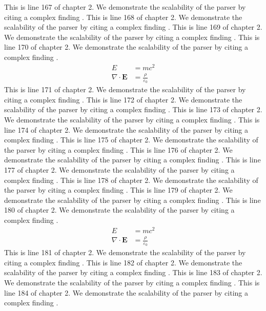 This is line 167 of chapter 2. We demonstrate the scalability of the parser by citing a complex finding \cite{ref2_167}.
This is line 168 of chapter 2. We demonstrate the scalability of the parser by citing a complex finding \cite{ref2_168}.
This is line 169 of chapter 2. We demonstrate the scalability of the parser by citing a complex finding \cite{ref2_169}.
This is line 170 of chapter 2. We demonstrate the scalability of the parser by citing a complex finding \cite{ref2_170}.
\begin{align*}
  E &= mc^2 \\
  \nabla \cdot \mathbf{E} &= \frac{\rho}{\varepsilon_0}
\end{align*}
This is line 171 of chapter 2. We demonstrate the scalability of the parser by citing a complex finding \cite{ref2_171}.
This is line 172 of chapter 2. We demonstrate the scalability of the parser by citing a complex finding \cite{ref2_172}.
This is line 173 of chapter 2. We demonstrate the scalability of the parser by citing a complex finding \cite{ref2_173}.
This is line 174 of chapter 2. We demonstrate the scalability of the parser by citing a complex finding \cite{ref2_174}.
This is line 175 of chapter 2. We demonstrate the scalability of the parser by citing a complex finding \cite{ref2_175}.
This is line 176 of chapter 2. We demonstrate the scalability of the parser by citing a complex finding \cite{ref2_176}.
This is line 177 of chapter 2. We demonstrate the scalability of the parser by citing a complex finding \cite{ref2_177}.
This is line 178 of chapter 2. We demonstrate the scalability of the parser by citing a complex finding \cite{ref2_178}.
This is line 179 of chapter 2. We demonstrate the scalability of the parser by citing a complex finding \cite{ref2_179}.
This is line 180 of chapter 2. We demonstrate the scalability of the parser by citing a complex finding \cite{ref2_180}.
\begin{align*}
  E &= mc^2 \\
  \nabla \cdot \mathbf{E} &= \frac{\rho}{\varepsilon_0}
\end{align*}
This is line 181 of chapter 2. We demonstrate the scalability of the parser by citing a complex finding \cite{ref2_181}.
This is line 182 of chapter 2. We demonstrate the scalability of the parser by citing a complex finding \cite{ref2_182}.
This is line 183 of chapter 2. We demonstrate the scalability of the parser by citing a complex finding \cite{ref2_183}.
This is line 184 of chapter 2. We demonstrate the scalability of the parser by citing a complex finding \cite{ref2_184}.

